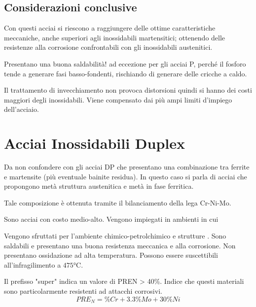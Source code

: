 
\subsection{Considerazioni conclusive}
Con questi acciai si riescono a raggiungere delle ottime caratteristiche meccaniche, anche superiori agli inossidabili martensitici; ottenendo delle resistenze alla corrosione confrontabili con gli inossidabili austenitici.

Presentano una buona saldabilità! ad eccezione per gli acciai P, perché il fosforo tende a generare fasi basso-fondenti, rischiando di generare delle cricche a caldo.

Il trattamento di invecchiamento non provoca distorsioni quindi si hanno dei costi maggiori degli inossidabili. Viene compensato dai più ampi limiti d'impiego dell'acciaio.


\section{Acciai Inossidabili Duplex}
Da non confondere con gli acciai \ac{DP} che presentano una combinazione tra ferrite e martensite (più eventuale bainite residua).
In questo caso si parla di acciai che propongono metà struttura austenitica e metà in fase ferritica.

Tale composizione è ottenuta tramite il bilanciamento della lega Cr-Ni-Mo.

Sono acciai con costo medio-alto. Vengono impiegati in ambienti in cui


Vengono sfruttati per l'ambiente chimico-petrolchimico e strutture .
Sono saldabili e presentano una buona resistenza meccanica e alla corrosione. Non presentano ossidazione ad alta temperatura.
Possono essere suscettibili all'infragilimento a $475\unit{\celsius}$.


Il prefisso "super" indica un valore di \ac{PREN} > 40\%.
Indice che questi materiali sono particolarmente resistenti ad attacchi corrosivi.
\begin{equation}
PRE_N = \%Cr + 3.3 \%Mo + 30 \%Ni
\end{equation}


